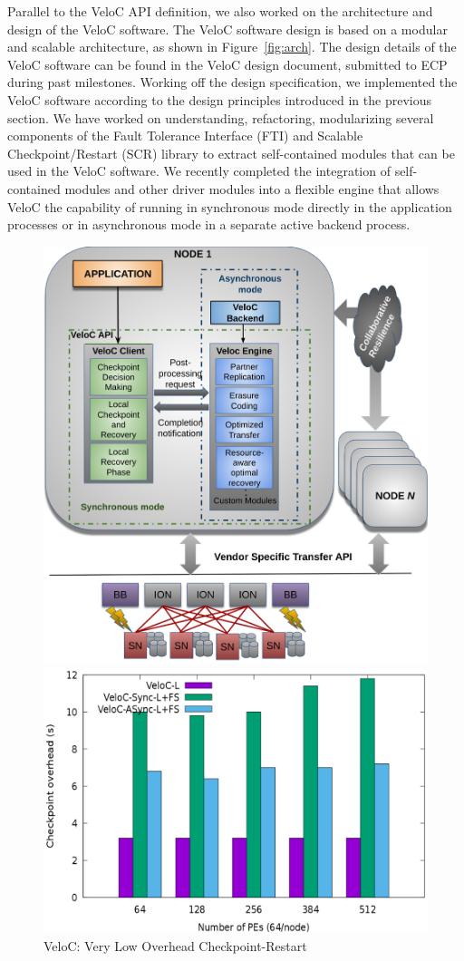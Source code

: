 Parallel to the VeloC API definition, we also worked on the
architecture and design of the VeloC software. The VeloC software
design is based on a modular and scalable architecture, as shown in
Figure~\ref{fig:arch}. The design details of the VeloC software
can be found in the VeloC design document, submitted to ECP during
past milestones. Working off the design specification, we implemented
the VeloC software according to the design principles introduced in
the previous section. We have worked on understanding, refactoring,
modularizing several components of the Fault Tolerance Interface
(FTI) and Scalable Checkpoint/Restart (SCR) library to extract
self-contained modules that can be used in the VeloC software. We
recently completed the integration of self-contained modules and
other driver modules into a flexible engine that allows VeloC the
capability of running in synchronous mode directly in the application
processes or in asynchronous mode in a separate active backend
process.

\begin{figure}[t]
\centering
  \begin{subfloat}
  	\centering
      \includegraphics[width=.47\textwidth]{projects/2.3.4-DataViz/2.3.4.05-VeloC/veloc-arch}
\end{subfloat}
  \hfill
  \begin{subfloat}
  	\centering
    \includegraphics[width=.47\textwidth]{projects/2.3.4-DataViz/2.3.4.05-VeloC/veloc-res}
\end{subfloat}
  \caption{VeloC: Very Low Overhead Checkpoint-Restart}%
  \label{fig:veloc}%
\end{figure}


